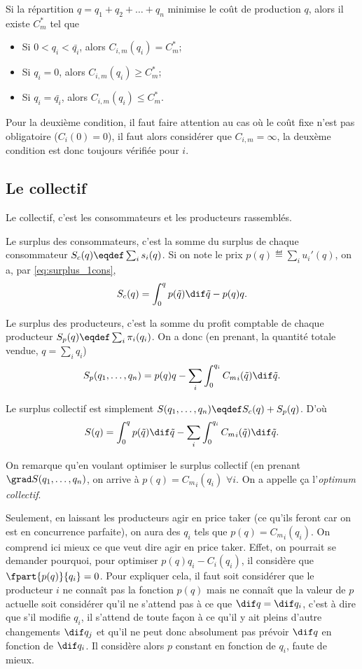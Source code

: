 Si la répartition $q = q_1 + q_2 + \ldots + q_n$ minimise le coût de
production $q$, alors il existe $C_m^*$ tel que
\begin{itemize}
  \item Si $0 < q_i < \bar{q_i}$, alors $C_{i,m}(q_i) = C_m^*$;
  \item Si $q_i = 0$, alors $C_{i,m}(q_i) \geq C_m^*$;
  \item Si $q_i = \bar{q_i}$, alors $C_{i,m}(q_i) \leq C_m^*$.
\end{itemize}

Pour la deuxième condition, il faut faire attention au cas où le coût fixe
n'est pas obligatoire ($C_i(0) = 0$), il faut alors considérer que
$C_{i,m}=\infty$, la deuxème condition est donc toujours vérifiée pour $i$.

\subsection{Le collectif}
Le collectif, c'est les consommateurs et les producteurs rassemblés.

Le surplus des consommateurs, c'est la somme du surplus de chaque consommateur
$\surpluscons(q) \eqdef \sum_i s_i(q)$.
Si on note le prix $p(q) \eqdef \sum_i u_i'(q)$, on a, par \eqref{eq:surplus_1cons},
\[ \surpluscons(q) = \int_0^{q}p(\tilde{q}) \dif \tilde{q} - p(q) q. \]

Le surplus des producteurs, c'est la somme du profit comptable de chaque
producteur
$\surplusprod(q) \eqdef \sum_i \pcompt_i(q_i)$.
On a donc (en prenant, la quantité totale vendue, $q = \sum_i q_i$)
\[ \surplusprod(q_1, \ldots, q_n) = p(q)q -
\sum_i \int_0^{q_i} {C_m}_i(\tilde{q}) \dif \tilde{q}. \]

Le surplus collectif est simplement
$\surpluscoll(q_1, \ldots, q_n)
\eqdef \surpluscons(q) + \surplusprod(q)$.
D'où
\[ \surpluscoll(q) = \int_0^{q}p(\tilde{q}) \dif \tilde{q}
- \sum_i \int_0^{q_i} {C_m}_i(\tilde{q}) \dif \tilde{q}. \]

On remarque qu'en voulant optimiser le surplus collectif
(en prenant $\grad \surpluscoll(q_1, \ldots, q_n)$,
on arrive à $p(q) = {C_m}_i(q_i)$ $\forall i$.
On a appelle ça l'\emph{optimum collectif}.

Seulement, en laissant les producteurs agir en price taker
(ce qu'ils feront car on est en concurrence parfaite),
on aura des $q_i$ tels que $p(q) = {C_m}_i(q_i)$.
On comprend ici mieux ce que veut dire agir en price taker.
Effet, on pourrait se demander pourquoi, pour optimiser
$p(q)q_i - {C}_i(q_i)$, il considère que $\fpart{p(q)}{q_i} = 0$.
Pour expliquer cela,
il faut soit considérer que le producteur $i$ ne connaît pas la fonction $p(q)$
mais ne connaît que la valeur de $p$ actuelle soit considérer qu'il
ne s'attend pas à ce que $\dif q = \dif q_i$, c'est à dire que s'il modifie
$q_i$, il s'attend de toute façon à ce qu'il y ait pleins d'autre changements
$\dif q_j$ et qu'il ne peut donc absolument pas prévoir $\dif q$ en fonction
de $\dif q_i$. Il considère alors $p$ constant en fonction de $q_i$,
faute de mieux.

